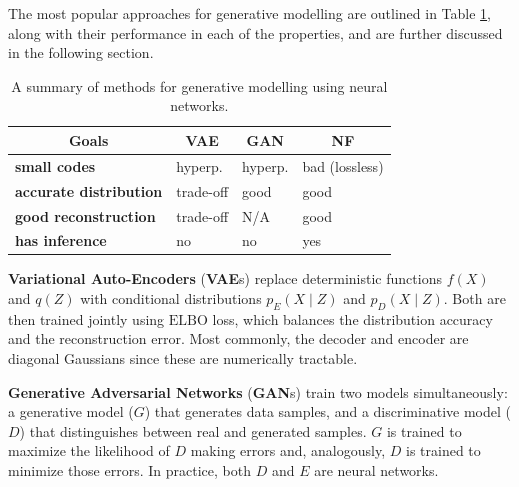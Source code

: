 
The most popular approaches for generative modelling are outlined in Table \ref{table:gnn-methods}, along with their performance in each of the properties, and are further discussed in the following section.


\begin{table}[ht]
\centering
\begin{tabular}{@{}llll@{}}
\toprule
\multicolumn{1}{c}{\textbf{Goals}}                                                               & \multicolumn{1}{c}{\textbf{VAE} \cite{kingma2013vae}} & \multicolumn{1}{c}{\textbf{GAN} \cite{goodfellow2014gan}} & \multicolumn{1}{c}{\textbf{NF} \cite{rezende2016nf}} \\ \midrule
\textbf{small codes}                                                                             & hyperp.                          & hyperp.                          & bad (lossless)                        \\
\textbf{accurate distribution}     & trade-off                        & good                             & good                            \\
\textbf{good reconstruction} & trade-off                        & N/A                            & good                            \\
\textbf{has inference} & no                        & no                            & yes                            \\\bottomrule
\end{tabular}
\caption{A summary of methods for generative modelling using neural networks.}\label{table:gnn-methods}
\end{table}

\textbf{Variational Auto-Encoders} (\textbf{VAE}s) \cite{kingma2013vae} replace deterministic functions $f(X)$ and $q(Z)$ with conditional distributions $p_E(X \mid Z)$ and $p_D(X \mid Z)$. Both are then trained jointly using $\mathrm{ELBO}$ loss, which balances the distribution accuracy and the reconstruction error.
Most commonly, the decoder and encoder are diagonal Gaussians since these are numerically tractable.

\textbf{Generative Adversarial Networks} (\textbf{GAN}s) \cite{goodfellow2014gan} train two models simultaneously: a generative model ($G$) that generates data samples, and a discriminative model ($D$) that distinguishes between real and generated samples.
$G$ is trained to maximize the likelihood of $D$ making errors and, analogously, $D$ is trained to minimize those errors. In practice, both $D$ and $E$ are neural networks.

